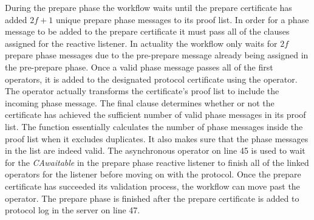 During the prepare phase the workflow waits until the prepare certificate has added $2f+1$ unique prepare phase messages to its proof list. In order for a phase message to be added to the prepare certificate it must pass all of the  clauses assigned for the reactive listener. In actuality the workflow only waits for $2f$ prepare phase messages due to the pre-prepare message already being assigned in the pre-prepare phase. Once a valid phase message passes all of the first  operators, it is added to the designated protocol certificate using the  operator. The  operator actually transforms the certificate’s proof list to include the incoming phase message.  The final  clause determines whether or not the certificate has achieved the sufficient number of valid phase messages in its proof list.
The  function essentially calculates the number of phase messages inside the proof list when it excludes duplicates. It also makes sure that the phase messages in the list are indeed valid. The asynchronous  operator on line 45 is used to wait for the \emph{CAwaitable} in the prepare phase reactive listener to finish all of the linked operators for the listener before moving on with the protocol. Once the prepare certificate has succeeded its validation process, the workflow can move past the  operator. The prepare phase is finished after the prepare certificate is added to protocol log in the server on line 47.

